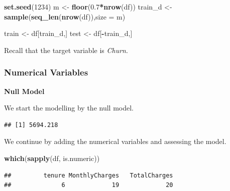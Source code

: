 \documentclass[
  twoside]{article}
\newenvironment{Shaded}{\begin{snugshade}}{\end{snugshade}}
\newcommand{\AttributeTok}[1]{\textcolor[rgb]{0.13,0.29,0.53}{#1}}
\newcommand{\DecValTok}[1]{\textcolor[rgb]{0.00,0.00,0.81}{#1}}
\newcommand{\FloatTok}[1]{\textcolor[rgb]{0.00,0.00,0.81}{#1}}
\newcommand{\FunctionTok}[1]{\textcolor[rgb]{0.13,0.29,0.53}{\textbf{#1}}}
\newcommand{\NormalTok}[1]{#1}
\newcommand{\OtherTok}[1]{\textcolor[rgb]{0.56,0.35,0.01}{#1}}
\newcommand{\SpecialCharTok}[1]{\textcolor[rgb]{0.81,0.36,0.00}{\textbf{#1}}}
\begin{document}
\begin{Shaded}
\begin{Highlighting}[]
\FunctionTok{set.seed}\NormalTok{(}\DecValTok{1234}\NormalTok{)}
\NormalTok{m }\OtherTok{\textless{}{-}} \FunctionTok{floor}\NormalTok{(}\FloatTok{0.7}\SpecialCharTok{*}\FunctionTok{nrow}\NormalTok{(df))}
\NormalTok{train\_d }\OtherTok{\textless{}{-}} \FunctionTok{sample}\NormalTok{(}\FunctionTok{seq\_len}\NormalTok{(}\FunctionTok{nrow}\NormalTok{(df)),}\AttributeTok{size =}\NormalTok{ m)}

\NormalTok{train }\OtherTok{\textless{}{-}}\NormalTok{ df[train\_d,]}
\NormalTok{test }\OtherTok{\textless{}{-}}\NormalTok{ df[}\SpecialCharTok{{-}}\NormalTok{train\_d,]}
\end{Highlighting}
\end{Shaded}

Recall that the target variable is \emph{Churn}.

\hypertarget{numerical-variables}{%
\subsubsection{Numerical Variables}\label{numerical-variables}}

\textbf{Null Model}

We start the modelling by the null model.

\begin{Shaded}
\end{Shaded}

\begin{verbatim}
## [1] 5694.218
\end{verbatim}

We continue by adding the numerical variables and assessing the model.

\begin{Shaded}
\begin{Highlighting}[]
\FunctionTok{which}\NormalTok{(}\FunctionTok{sapply}\NormalTok{(df, is.numeric))}
\end{Highlighting}
\end{Shaded}

\begin{verbatim}
##         tenure MonthlyCharges   TotalCharges 
##              6             19             20
\end{verbatim}
\end{document}
